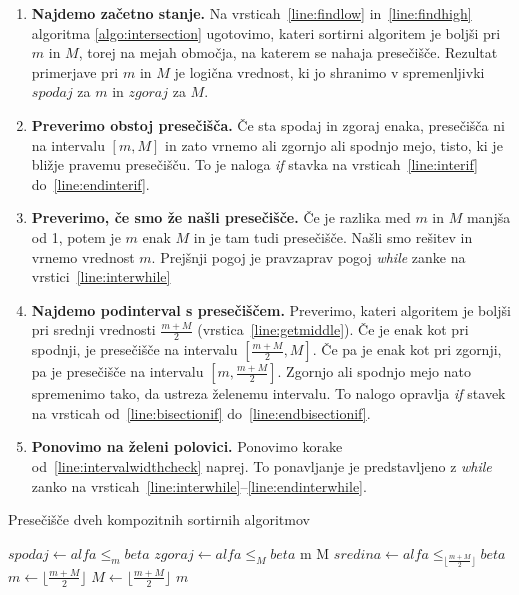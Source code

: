 \documentclass[a4paper,oneside,12pt]{article}
\def\False{\texttt{false}}
\def\True{\texttt{true}}
\begin{document}
\begin{enumerate}
  \item \textbf{Najdemo začetno stanje.} Na vrsticah~\ref{line:findlow} in~\ref{line:findhigh} algoritma
   \ref{algo:intersection} ugotovimo, kateri sortirni
    algoritem je boljši pri $m$ in $M$, torej na mejah območja, na katerem se nahaja
    presečišče. Rezultat primerjave pri $m$ in $M$ je logična vrednost, ki jo shranimo
    v spremenljivki $spodaj$ za $m$ in $zgoraj$ za $M$.
  \item \textbf{Preverimo obstoj presečišča.} Če sta spodaj in zgoraj enaka, presečišča ni na intervalu $[m, M]$ in zato
    vrnemo ali zgornjo ali spodnjo mejo, tisto, ki je bližje pravemu presečišču. To je
    naloga \emph{if} stavka na vrsticah~\ref{line:interif} do~\ref{line:endinterif}.
  \item \textbf{Preverimo, če smo že našli presečišče.} \label{line:intervalwidthcheck}Če je razlika med $m$ in $M$ manjša od 1, potem je $m$ enak $M$ in je tam tudi
    presečišče. Našli smo rešitev in vrnemo vrednost $m$. Prejšnji pogoj je pravzaprav
    pogoj \emph{while} zanke na vrstici~\ref{line:interwhile}
  \item \textbf{Najdemo podinterval s presečiščem.} Preverimo, kateri algoritem je boljši pri srednji vrednosti $\frac{m+M}{2}$
    (vrstica~\ref{line:getmiddle}).
    Če je enak kot pri spodnji, je presečišče na intervalu $\left[\frac{m+M}{2}, M\right]$. Če pa je
    enak kot pri zgornji, pa je presečišče na intervalu $\left[m, \frac{m+M}{2}\right]$.
    Zgornjo ali spodnjo mejo nato spremenimo tako, da ustreza želenemu intervalu. To
    nalogo opravlja \emph{if} stavek na vrsticah od~\ref{line:bisectionif} do~\ref{line:endbisectionif}.
  \item \textbf{Ponovimo na želeni polovici.} Ponovimo korake od~\ref{line:intervalwidthcheck} naprej. To ponavljanje je
    predstavljeno z \emph{while} zanko na vrsticah~\ref{line:interwhile}--\ref{line:endinterwhile}.
\end{enumerate}

\begin{algorithm}[h!t!]
  \caption{Presečišče dveh kompozitnih sortirnih algoritmov}\label{algo:intersection}
  \begin{algorithmic}[1]
      \State $spodaj \gets alfa \leq_m beta$ \label{line:findlow} 
      \State $zgoraj \gets alfa \leq_M beta$ \label{line:findhigh}
      \If{$spodaj = zgoraj = \False$} \label{line:interif}
        \Return m 
      \ElsIf{$spodaj = zgoraj = \True$}
        \Return M 
      \EndIf \label{line:endinterif}
       \label{line:interwhile}
        \State $sredina \gets alfa \leq_{\lfloor\frac{m+M}{2}\rfloor} beta$
        \label{line:getmiddle}
         \label{line:bisectionif}
          \State $m \gets \lfloor\frac{m+M}{2}\rfloor$
        \Else
          \State $M \gets \lfloor\frac{m+M}{2}\rfloor$
          \EndIf \label{line:endbisectionif}
        \EndWhile \label{line:endinterwhile}
      \State \Return $m$
    \EndFunction
  \end{algorithmic}
\end{algorithm}
\end{document}
